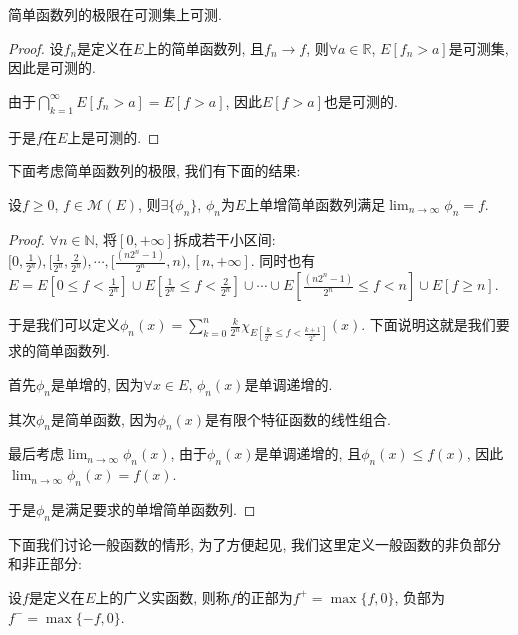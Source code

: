 \documentclass[theorem=false,mathfont=none,openany,sub3section]{easybook}
\begin{document}
\begin{corollary}
  简单函数列的极限在可测集上可测.\par
\end{corollary}

\begin{proof}
  设$f_n$是定义在$E$上的简单函数列, 且$f_n\to f$, 则$\forall a\in \mathbb{R}$, $E[f_n>a]$是可测集, 因此是可测的.\par
  由于$\bigcap_{k=1}^{\infty}E[f_n> a]=E[f>a]$, 因此$E[f>a]$也是可测的.\par
  于是$f$在$E$上是可测的.\par
\end{proof}

下面考虑简单函数列的极限, 我们有下面的结果:\par

\begin{theorem}
  设$f\geqslant 0$, $f\in \mathcal{M}(E)$, 则$\exists \{\phi_n\}$, $\phi_n$为$E$上单增简单函数列满足$\lim_{n \to \infty} \phi_n = f$.\par
\end{theorem}

\begin{proof}
  $\forall n \in \mathbb{N}$, 将$[0,+\infty]$拆成若干小区间: $[0,\frac{1}{2^n}), [\frac{1}{2^n}, \frac{2}{2^n}), \cdots, [\frac{(n2^n-1)}{2^n},n),[n,+\infty]$.
  同时也有$E=E[0\leqslant f<\frac{1}{2^n}]\cup E[\frac{1}{2^n}\leqslant f<\frac{2}{2^n}]\cup \cdots \cup E[\frac{(n2^n-1)}{2^n}\leqslant f<n]\cup E[f\geqslant n]$.\par
  于是我们可以定义$\phi_n(x)=\sum_{k=0}^{n} \frac{k}{2^n}\chi_{E[\frac{k}{2^n}\leqslant f<\frac{k+1}{2^n}]}(x)$. 下面说明这就是我们要求的简单函数列.\par
  首先$\phi_n$是单增的, 因为$\forall x\in E$, $\phi_n(x)$是单调递增的.\par
  其次$\phi_n$是简单函数, 因为$\phi_n(x)$是有限个特征函数的线性组合.\par
  最后考虑$\lim_{n \to \infty} \phi_n(x)$, 由于$\phi_n(x)$是单调递增的, 且$\phi_n(x)\leqslant f(x)$, 因此$\lim_{n \to \infty} \phi_n(x) = f(x)$.\par
  于是$\phi_n$是满足要求的单增简单函数列.\par
\end{proof}

下面我们讨论一般函数的情形, 为了方便起见, 我们这里定义一般函数的非负部分和非正部分:\par

\begin{definition}
  设$f$是定义在$E$上的广义实函数, 则称$f$的正部为$f^+=\max\{f,0\}$, 负部为$f^-=\max\{-f,0\}$.\par
\end{definition}
\end{document}
